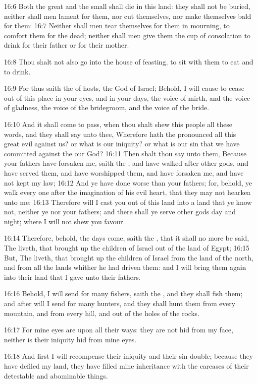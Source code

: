 16:6 Both the great and the small shall die in this land: they shall
not be buried, neither shall men lament for them, nor cut themselves,
nor make themselves bald for them: 16:7 Neither shall men tear
themselves for them in mourning, to comfort them for the dead; neither
shall men give them the cup of consolation to drink for their father
or for their mother.

16:8 Thou shalt not also go into the house of feasting, to sit with
them to eat and to drink.

16:9 For thus saith the \LORD of hosts, the God of Israel; Behold, I
will cause to cease out of this place in your eyes, and in your days,
the voice of mirth, and the voice of gladness, the voice of the
bridegroom, and the voice of the bride.

16:10 And it shall come to pass, when thou shalt shew this people all
these words, and they shall say unto thee, Wherefore hath the \LORD
pronounced all this great evil against us? or what is our iniquity? or
what is our sin that we have committed against the \LORD our God?
16:11 Then shalt thou say unto them, Because your fathers have
forsaken me, saith the \LORD, and have walked after other gods, and
have served them, and have worshipped them, and have forsaken me, and
have not kept my law; 16:12 And ye have done worse than your fathers;
for, behold, ye walk every one after the imagination of his evil
heart, that they may not hearken unto me: 16:13 Therefore will I cast
you out of this land into a land that ye know not, neither ye nor your
fathers; and there shall ye serve other gods day and night; where I
will not shew you favour.

16:14 Therefore, behold, the days come, saith the \LORD, that it shall
no more be said, The \LORD liveth, that brought up the children of
Israel out of the land of Egypt; 16:15 But, The \LORD liveth, that
brought up the children of Israel from the land of the north, and from
all the lands whither he had driven them: and I will bring them again
into their land that I gave unto their fathers.

16:16 Behold, I will send for many fishers, saith the \LORD, and they
shall fish them; and after will I send for many hunters, and they
shall hunt them from every mountain, and from every hill, and out of
the holes of the rocks.

16:17 For mine eyes are upon all their ways: they are not hid from my
face, neither is their iniquity hid from mine eyes.

16:18 And first I will recompense their iniquity and their sin double;
because they have defiled my land, they have filled mine inheritance
with the carcases of their detestable and abominable things.

